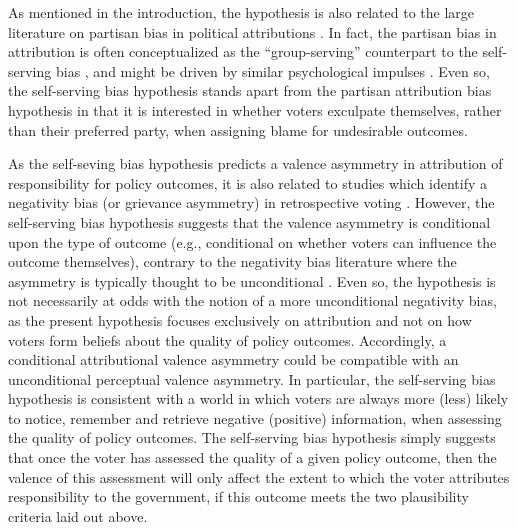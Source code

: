 \documentclass[a4paper,11pt]{article}
\begin{document}
	As mentioned in the introduction, the hypothesis is also related to the large literature on partisan bias in political attributions \cite[e.g.,]{malhotra2008attributing,healy2014partisaen,bisgaard2015bias}. In fact, the partisan bias in attribution is often conceptualized as the ``group-serving'' counterpart to the self-serving bias \cite[][701]{rudolph2003s}, and might be driven by similar psychological impulses \cite{lodge2013rationalizing,tilley2011government}. Even so, the self-serving bias hypothesis stands apart from the partisan attribution bias hypothesis in that it is interested in whether voters exculpate themselves, rather than their preferred party, when assigning blame for undesirable outcomes.
	
	
	As the self-seving bias hypothesis predicts a valence asymmetry in attribution of responsibility for policy outcomes, it is also related to studies which identify a negativity bias (or grievance asymmetry) in retrospective voting \cite[cf.][]{bloom1975voter,soroka2006good}. However, the self-serving bias hypothesis suggests that the valence asymmetry is conditional upon the type of outcome (e.g., conditional on whether voters can influence the outcome themselves), contrary to the negativity bias literature where the asymmetry is typically thought to be unconditional \citep[cf.][]{nannestad1997grievance}. Even so, the hypothesis is not necessarily at odds with the notion of a more unconditional negativity bias, as the present hypothesis focuses exclusively on attribution and not on how voters form beliefs about the quality of policy outcomes. Accordingly, a conditional attributional valence asymmetry could be compatible with an unconditional perceptual valence asymmetry. In particular, the self-serving bias hypothesis is consistent with a world in which voters are always more (less) likely to notice, remember and retrieve negative (positive) information, when assessing the quality of policy outcomes. The self-serving bias hypothesis simply suggests that once the voter has assessed the quality of a given policy outcome, then the valence of this assessment will only affect the extent to which the voter attributes responsibility to the government, if this outcome meets the two plausibility criteria laid out above.
	
\end{document}

